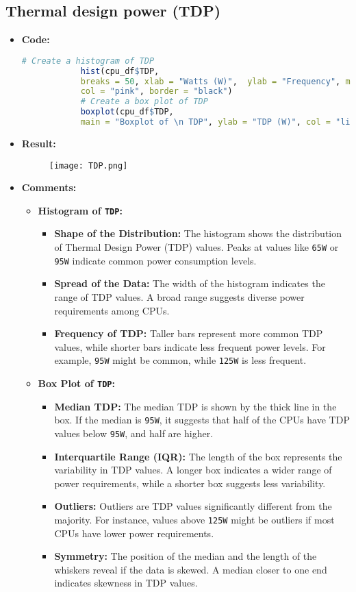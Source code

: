 \documentclass{article}
\begin{document}
	\subsection{Thermal design power (TDP)}
	\begin{itemize}
		\item \textbf{Code:}
		\begin{lstlisting}[basicstyle=\ttfamily, frame=single,language=R]
			# Create a histogram of TDP
			hist(cpu_df$TDP, 
			breaks = 50, xlab = "Watts (W)",  ylab = "Frequency", main = "Histogram of \n TDP", 
			col = "pink", border = "black")
			# Create a box plot of TDP
			boxplot(cpu_df$TDP, 
			main = "Boxplot of \n TDP", ylab = "TDP (W)", col = "lightblue", border = "black")
		\end{lstlisting}
		\item \textbf{Result:}
		\begin{figure}[h]
			\centering
			\texttt{[image: TDP.png]}    %
			\label{fig:enter-label}
		\end{figure}
		\item \textbf{Comments:}
		\begin{itemize}
			\item \textbf{Histogram of \texttt{TDP}:}
			\begin{itemize}
				\item \textbf{Shape of the Distribution:} The histogram shows the distribution of Thermal Design Power (TDP) values. Peaks at values like \texttt{65W} or \texttt{95W} indicate common power consumption levels.
				\item \textbf{Spread of the Data:} The width of the histogram indicates the range of TDP values. A broad range suggests diverse power requirements among CPUs.
				\item \textbf{Frequency of TDP:} Taller bars represent more common TDP values, while shorter bars indicate less frequent power levels. For example, \texttt{95W} might be common, while \texttt{125W} is less frequent.
			\end{itemize}
			\item \textbf{Box Plot of \texttt{TDP}:}
			\begin{itemize}
				\item \textbf{Median TDP:} The median TDP is shown by the thick line in the box. If the median is \texttt{95W}, it suggests that half of the CPUs have TDP values below \texttt{95W}, and half are higher.
				\item \textbf{Interquartile Range (IQR):} The length of the box represents the variability in TDP values. A longer box indicates a wider range of power requirements, while a shorter box suggests less variability.
				\item \textbf{Outliers:} Outliers are TDP values significantly different from the majority. For instance, values above \texttt{125W} might be outliers if most CPUs have lower power requirements.
				\item \textbf{Symmetry:} The position of the median and the length of the whiskers reveal if the data is skewed. A median closer to one end indicates skewness in TDP values.
			\end{itemize}
		\end{itemize}
	\end{itemize}
\end{document}
